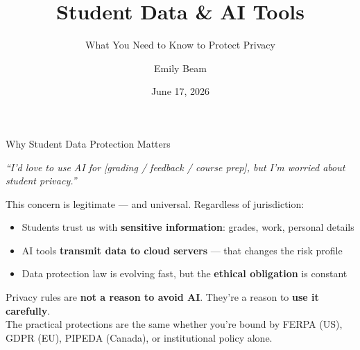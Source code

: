 \documentclass[aspectratio=169, 10pt]{beamer}
\title{Student Data \& AI Tools}
\subtitle{What You Need to Know to Protect Privacy}
\author{Emily Beam}
\institute{Department of Economics, University of Vermont}
\date{June 17, 2026}
\begin{document}
{
\begin{frame}[plain]
\end{frame}
}


\begin{frame}{Why Student Data Protection Matters}

\begin{tcolorbox}[quotebox]
\large\textit{``I'd love to use AI for [grading / feedback / course prep], but I'm worried about student privacy.''}
\end{tcolorbox}

\vspace{0.3cm}

This concern is legitimate --- and universal. Regardless of jurisdiction:

\vspace{0.2cm}

\begin{itemize}
  \item Students trust us with \textbf{sensitive information}: grades, work, personal details
  \item AI tools \textbf{transmit data to cloud servers} --- that changes the risk profile
  \item Data protection law is evolving fast, but the \textbf{ethical obligation} is constant
\end{itemize}

\vspace{0.3cm}

\begin{tcolorbox}[accentbox]
\centering
\small Privacy rules are \textbf{not a reason to avoid AI}. They're a reason to \textbf{use it carefully}.\\[3pt]
The practical protections are the same whether you're bound by FERPA (US), GDPR (EU), PIPEDA (Canada), or institutional policy alone.
\end{tcolorbox}

\end{frame}
\end{document}
